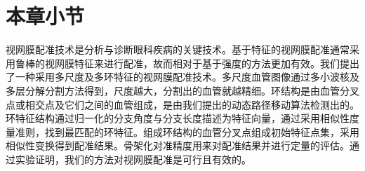 \section{本章小节}
\label{}

视网膜配准技术是分析与诊断眼科疾病的关键技术。基于特征的视网膜配准通常采用鲁棒的视网膜特征来进行配准，故而相对于基于强度的方法更加有效。我们提出了一种采用多尺度及多环特征的视网膜配准技术。多尺度血管图像通过多小波核及多层分解分割方法得到，尺度越大，分割出的血管就越精细。环结构是由血管分叉点或相交点及它们之间的血管组成，是由我们提出的动态路径移动算法检测出的。环特征结构通过归一化的分支角度与分支长度描述为特征向量，通过采用相似性度量准则，找到最匹配的环特征。组成环结构的血管分叉点组成初始特征点集，采用相似性变换得到配准结果。骨架化对准精度用来对配准结果并进行定量的评估。通过实验证明，我们的方法对视网膜配准是可行且有效的。
